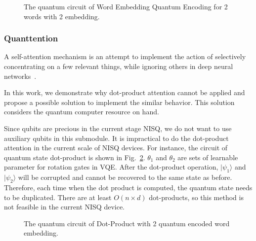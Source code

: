\begin{figure}[htp]
  \centering
  \caption{The quantum circuit of Word Embedding Quantum Encoding for 2 words with 2 embedding.}
  \label{fig:embedding}
\end{figure}

\subsubsection{Quanttention}
A self-attention mechanism is an attempt to implement the action of selectively concentrating on a few relevant things, while ignoring others in deep neural networks~\cite{}.

In this work, we demonstrate why dot-product attention cannot be applied and propose a possible solution to implement the similar behavior. This solution considers the quantum computer resource on hand.

Since qubits are precious in the current stage NISQ, we do not want to use auxiliary qubits in this submodule. It is impractical to do the dot-product attention in the current scale of NISQ devices. For instance, the circuit of quantum state dot-product is shown in Fig.~\ref{fig:dot-product}. $\theta_1$ and $\theta_2$ are sets of learnable parameter for rotation gates in VQE. After the dot-product operation, $|\psi_1\rangle$ and $|\psi_2\rangle$ will be corrupted and cannot be recovered to the same state as before. Therefore, each time when the dot product is computed, the quantum state needs to be duplicated. There are at least $O(n \times d)$ dot-products, so this method is not feasible in the current NISQ device.

\begin{figure}[htp]
  \centering
  \caption{The quantum circuit of Dot-Product with 2 quantum encoded word embedding.}
  \label{fig:dot-product}
\end{figure}


